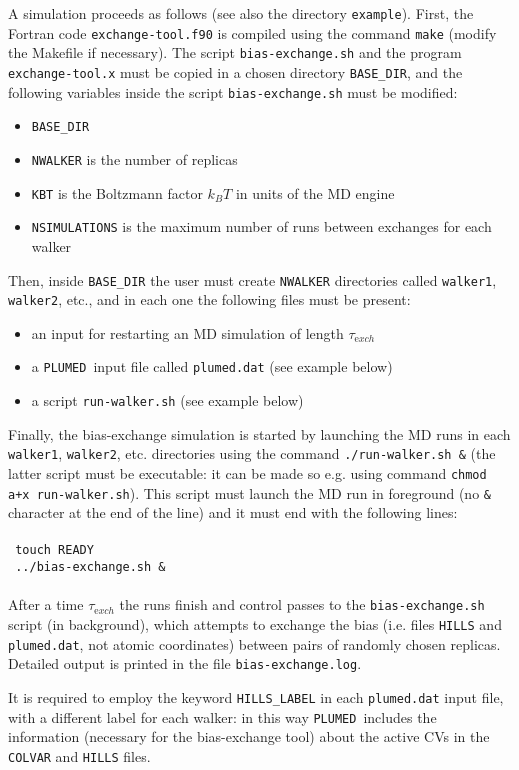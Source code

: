 \documentclass[12pt,fleqn]{report}
\newcommand{\keyword}[1]{\index{Keywords!{\tt #1}} {\tt #1}}
\newcommand{\plumed}{{\tt PLUMED}}
\begin{document}
A simulation proceeds as follows (see also the directory {\tt example}).
First, the Fortran code {\tt exchange-tool.f90}
is compiled using the command {\tt make} (modify the Makefile if necessary).
The script {\tt bias-exchange.sh} and the
program {\tt exchange-tool.x} must be copied in a chosen directory {\tt BASE\_DIR},
and the following variables inside the script {\tt bias-exchange.sh} must be modified:
\begin{itemize}
\item {\tt BASE\_DIR}
\item {\tt NWALKER} is the number of replicas
\item {\tt KBT} is the Boltzmann factor $k_BT$ in units of the MD engine
\item {\tt NSIMULATIONS} is the maximum number of runs between exchanges for each walker
\end{itemize}
Then, inside {\tt BASE\_DIR} the user must create {\tt NWALKER} directories called {\tt walker1}, {\tt walker2}, etc.,
and in each one the following files must be present:
\begin{itemize}
\item an input for restarting an MD simulation of length $\tau_{\mathrm exch}$
\item a \plumed\ input file called {\tt plumed.dat} (see example below)
\item a script {\tt run-walker.sh} (see example below)
\end{itemize}
Finally, the bias-exchange simulation is started by launching the MD runs in each {\tt walker1}, {\tt walker2}, etc. directories using the command {\tt ./run-walker.sh \&} (the latter script must be executable: it can be made so e.g. using command {\tt chmod a+x run-walker.sh}).
This script must launch the MD run in foreground (no {\tt \&} character at the end of the line) and it must end 
with the following lines: \\
\\
{\tt \ touch READY} \\
{\tt \ ../bias-exchange.sh \&} \\
\\
After a time $\tau_{\mathrm exch}$ the runs finish and control passes to the {\tt bias-exchange.sh} script (in background), which attempts
to exchange the bias (i.e. files {\tt HILLS} and {\tt plumed.dat}, not atomic coordinates) between pairs of randomly chosen replicas.
Detailed output is printed in the file {\tt bias-exchange.log}.

It is required to employ the keyword \keyword{HILLS\_LABEL} in each {\tt plumed.dat} input file, with a different label for each walker: 
in this way \plumed\ includes the information (necessary for the bias-exchange tool)
about the active CVs in the {\tt COLVAR} and {\tt HILLS} files.
\end{document}
